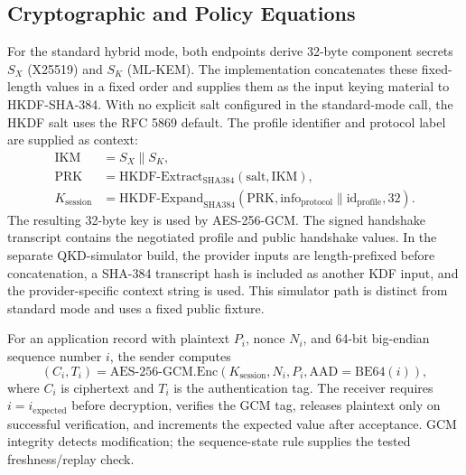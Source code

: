 \documentclass[journal]{IEEEtran}
\begin{document}
\subsection{Cryptographic and Policy Equations}
For the standard hybrid mode, both endpoints derive 32-byte component secrets $S_X$ (X25519) and $S_K$ (ML-KEM). The implementation concatenates these fixed-length values in a fixed order and supplies them as the input keying material to HKDF-SHA-384. With no explicit salt configured in the standard-mode call, the HKDF salt uses the RFC 5869 default. The profile identifier and protocol label are supplied as context:
\begin{align}
  \mathrm{IKM} &= S_X \parallel S_K, \\
  \mathrm{PRK} &= \mathrm{HKDF\mbox{-}Extract}_{\mathrm{SHA384}}(\mathrm{salt},\mathrm{IKM}), \\
  K_{\mathrm{session}} &= \mathrm{HKDF\mbox{-}Expand}_{\mathrm{SHA384}}
      (\mathrm{PRK},\mathrm{info}_{\mathrm{protocol}}\parallel\mathrm{id}_{\mathrm{profile}},32).
\end{align}
The resulting 32-byte key is used by AES-256-GCM. The signed handshake transcript contains the negotiated profile and public handshake values. In the separate QKD-simulator build, the provider inputs are length-prefixed before concatenation, a SHA-384 transcript hash is included as another KDF input, and the provider-specific context string is used. This simulator path is distinct from standard mode and uses a fixed public fixture.

For an application record with plaintext $P_i$, nonce $N_i$, and 64-bit big-endian sequence number $i$, the sender computes
\begin{equation}
  (C_i,T_i)=\mathrm{AES\mbox{-}256\mbox{-}GCM.Enc}
       (K_{\mathrm{session}},N_i,P_i,\mathrm{AAD}=\mathrm{BE64}(i)),
\end{equation}
where $C_i$ is ciphertext and $T_i$ is the authentication tag. The receiver requires $i=i_{\mathrm{expected}}$ before decryption, verifies the GCM tag, releases plaintext only on successful verification, and increments the expected value after acceptance. GCM integrity detects modification; the sequence-state rule supplies the tested freshness/replay check.
\end{document}
